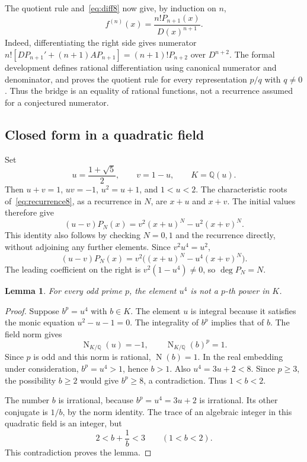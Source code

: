 \documentclass[11pt]{article}
\newtheorem{lemma}[theorem]{Lemma}
\newcommand{\Q}{\mathbb Q}
\begin{document}
The quotient rule and~\eqref{eq:diff8} now give, by induction on $n$,
\begin{equation}\label{eq:derivative8}
\boxed{f^{(n)}(x)=\frac{n!P_{n+1}(x)}{D(x)^{n+1}}.}
\end{equation}
Indeed, differentiating the right side gives numerator
$n![D P_{n+1}'+(n+1)A P_{n+1}]=(n+1)!P_{n+2}$ over $D^{n+2}$.
The formal development defines rational differentiation using canonical
numerator and denominator, and proves the quotient rule for every
representation $p/q$ with $q\ne0$. Thus the bridge is an equality of
rational functions, not a recurrence assumed for a conjectured numerator.

\subsection{Closed form in a quadratic field}

Set
\[
u=\frac{1+\sqrt5}{2},\qquad v=1-u,\qquad K=\Q(u).
\]
Then $u+v=1$, $uv=-1$, $u^2=u+1$, and $1<u<2$. The characteristic
roots of~\eqref{eq:recurrence8}, as a recurrence in $N$, are $x+u$
and $x+v$. The initial values therefore give
\begin{equation}\label{eq:closed8}
(u-v)P_N(x)=v^2(x+u)^N-u^2(x+v)^N.
\end{equation}
This identity also follows by checking $N=0,1$ and the recurrence
directly, without adjoining any further elements. Since $v^2u^4=u^2$,
\begin{equation}\label{eq:mobius8}
(u-v)P_N(x)=v^2\big((x+u)^N-u^4(x+v)^N\big).
\end{equation}
The leading coefficient on the right is $v^2(1-u^4)\ne0$, so
$\deg P_N=N$.

\begin{lemma}\label{lem:unit8}
For every odd prime $p$, the element $u^4$ is not a $p$-th power in $K$.
\end{lemma}
\begin{proof}
Suppose $b^p=u^4$ with $b\in K$. The element $u$ is integral because it
satisfies the monic equation $u^2-u-1=0$. The integrality of $b^p$ implies
that of $b$. The field norm gives
\[
\operatorname{N}_{K/\Q}(u)=-1,\qquad
\operatorname{N}_{K/\Q}(b)^p=1.
\]
Since $p$ is odd and this norm is rational, $\operatorname{N}(b)=1$.
In the real embedding under consideration, $b^p=u^4>1$, hence $b>1$.
Also $u^4=3u+2<8$. Since $p\geq3$, the possibility $b\geq2$ would
give $b^p\geq8$, a contradiction. Thus $1<b<2$.

The number $b$ is irrational, because $b^p=u^4=3u+2$ is irrational.
Its other conjugate is $1/b$, by the norm identity. The trace of an
algebraic integer in this quadratic field is an integer, but
\[
2<b+\frac1b<3\qquad(1<b<2).
\]
This contradiction proves the lemma.
\end{proof}
\end{document}
